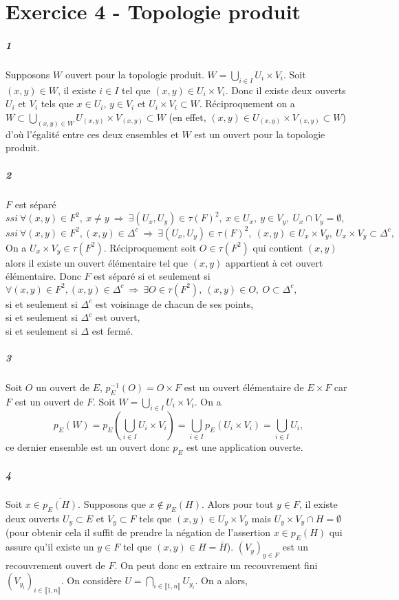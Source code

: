 \documentclass[10pt,a4paper]{article}
\begin{document}
  \section{Exercice 4 - Topologie produit}
  \subparagraph{1} Supposons $W$ ouvert pour la topologie produit. $W = \underset{i \in I}{\bigcup} U_i \times V_i$. Soit $(x,y) \in W$, il existe $i \in I$ tel que $(x,y) \in U_i \times V_i$. Donc il existe deux ouverts $U_i$ et $V_i$ tels que $x\in U_i$, $y \in V_i$ et $U_i \times V_i \subset W$. Réciproquement on a $W \subset \underset{(x,y) \in W}{\bigcup} U_{(x,y)} \times V_{(x,y)} \subset W$ (en effet, $(x,y) \in U_{(x,y)} \times V_{(x,y)} \subset W$) d'où l'égalité entre ces deux ensembles et $W$ est un ouvert pour la topologie produit.
  \subparagraph{2}
  $F$ est séparé $ssi \ \forall (x,y) \in F^2, \ x \neq y \ \Rightarrow \ \exists (U_x,U_y) \in \tau(F)^2, \ x \in U_x, \ y \in V_y, \ U_x \cap V_y = \emptyset$,\\
  $ssi \ \forall (x,y) \in F^2, (x,y) \in \Delta^c \ \Rightarrow \ \exists (U_x,U_y) \in \tau(F)^2, \ (x,y) \in U_x \times V_y, \ U_x \times V_y \subset \Delta^c,$ \\
On a  $U_x \times V_y \in \tau(F^2)$. Réciproquement soit $O \in\tau(F^2)$ qui contient $(x,y)$ alors il existe un ouvert élémentaire tel que $(x,y)$ appartient à cet ouvert élémentaire.
  Donc $F$ est séparé si et seulement si $\forall (x,y) \in F^2, (x,y) \in \Delta^c \ \Rightarrow \ \exists O \in \tau(F^2), \ (x,y) \in O, \ O \subset \Delta^c,$ \\
  si et seulement si $\Delta^c$ est voisinage de chacun de ses points, \\
  si et seulement si $\Delta^c$ est ouvert,\\
  si et seulement si $\Delta$ est fermé.
  \subparagraph{3}Soit $O$ un ouvert de $E$, $p_E^{-1}(O) = O \times F$ est un ouvert élémentaire de $E \times F$ car $F$ est un ouvert de $F$. Soit $W = \underset{i \in I}{\bigcup} U_i \times V_i$. On a
  \[p_E(W) = p_E(\underset{i \in I}{\bigcup} U_i \times V_i) = \underset{i \in I}{\bigcup} p_E(U_i \times V_i) = \underset{i \in I}{\bigcup} U_i,\]
  ce dernier ensemble est un ouvert donc $p_E$ est une application ouverte.
  \subparagraph{4}Soit $x \in \overline{p_E(H)}$. Supposons que $x \notin p_E(H)$. Alors pour tout $y \in F$, il existe deux ouverts $U_y \subset E$ et $V_y \subset F$ tels que $(x,y) \in U_y \times V_y$ mais $U_y \times V_y \cap H = \emptyset$ (pour obtenir cela il suffit de prendre la négation de l'assertion $x \in p_E(H)$ qui assure qu'il existe un $y \in F$ tel que $(x,y) \in H = \overline{H}$). $(V_y)_{y \in F}$ est un recouvrement ouvert de $F$. On peut donc en extraire un recouvrement fini $(V_{y_i})_{i \in \llbracket 1,n \rrbracket}$. On considère $U = \underset{i \in \llbracket 1,n \rrbracket}{\bigcap} U_{y_i}$. On a alors,
\end{document}
